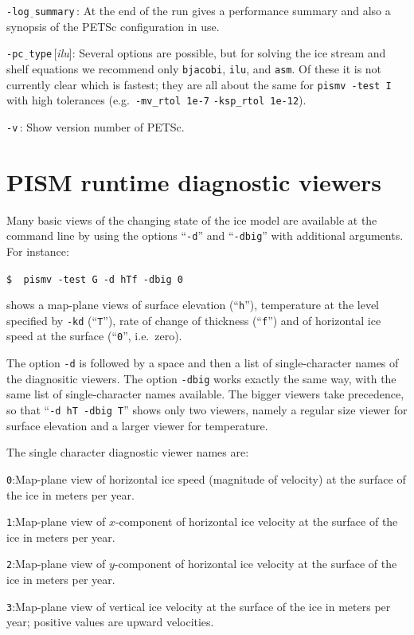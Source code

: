 \documentclass[11pt,final]{amsart}
\renewcommand{\t}[1]{\texttt{#1}}
\newcommand{\rawopt}[1]{\vspace{1mm}\noindent \Large\texttt{-#1}\normalsize}
\newcommand{\opt}[1]{\rawopt{#1}\,:\quad}
\newcommand{\optdef}[2]{\rawopt{#1}\,[\textsl{#2}]:\quad}
\newcommand{\und}{$\underline{\,\,\,}$}
\begin{document}
\opt{log\und summary}  At the end of the run gives a performance summary and also a synopsis of the PETSc configuration in use.

\optdef{pc\und type}{ilu}   Several options are possible, but for solving the ice stream and shelf equations we recommend only \t{bjacobi}, \t{ilu}, and \t{asm}.  Of these it is not currently clear which is fastest; they are all about the same for \verb|pismv -test I| with high tolerances (e.g.~\verb|-mv_rtol 1e-7| \verb|-ksp_rtol 1e-12|).

\opt{v}   Show version number of PETSc.


\clearpage \newpage
\section{PISM runtime diagnostic viewers}\label{sect:viewers}

Many basic views of the changing state of the ice model are available at the command line by using the options ``\t{-d}'' and ``\t{-dbig}'' with additional arguments.  For instance:

\verb|$  pismv -test G -d hTf -dbig 0|

\noindent shows a map-plane views of surface elevation (``\t{h}''), temperature at the level specified by \t{-kd} (``\t{T}''), rate of change of thickness (``\t{f}'') and of horizontal ice speed at the surface (``\t{0}'', i.e.~zero).

The option \t{-d} is followed by a space and then a list of single-character names of the diagnositic viewers.  The option \t{-dbig} works exactly the same way, with the same list of single-character names available.  The bigger viewers take precedence, so that ``\t{-d hT -dbig T}'' shows only two viewers, namely a regular size viewer for surface elevation and a larger viewer for temperature.

The single character diagnostic viewer names are:

\verb|0|:\quad Map-plane view of horizontal ice speed (magnitude of velocity) at the surface of the ice in meters per year.

\verb|1|:\quad Map-plane view of $x$-component of horizontal ice velocity at the surface of the ice in meters per year.

\verb|2|:\quad Map-plane view of $y$-component of horizontal ice velocity at the surface of the ice in meters per year.

\verb|3|:\quad Map-plane view of vertical ice velocity at the surface of the ice in meters per year; positive values are upward velocities.
\end{document}
